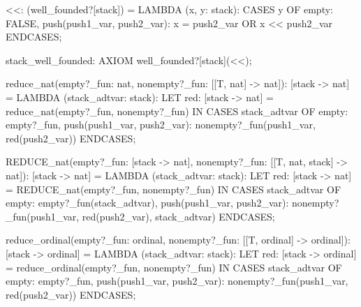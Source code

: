 
  <<:  (well_founded?[stack]) =
      LAMBDA (x, y: stack):
        CASES y
          OF empty: FALSE,
             push(push1_var, push2_var): x = push2_var OR x << push2_var
          ENDCASES;

  stack_well_founded: AXIOM well_founded?[stack](<<);

  reduce_nat(empty?_fun: nat, nonempty?_fun: [[T, nat] -> nat]):
  [stack -> nat] =
      LAMBDA (stack_adtvar: stack):
        LET red: [stack -> nat] = reduce_nat(empty?_fun, nonempty?_fun) IN
          CASES stack_adtvar
            OF empty: empty?_fun,
               push(push1_var, push2_var):
                 nonempty?_fun(push1_var, red(push2_var))
            ENDCASES;

  REDUCE_nat(empty?_fun: [stack -> nat],
             nonempty?_fun: [[T, nat, stack] -> nat]):
   [stack -> nat] =
      LAMBDA (stack_adtvar: stack):
        LET red: [stack -> nat] = REDUCE_nat(empty?_fun, nonempty?_fun) IN
          CASES stack_adtvar
            OF empty: empty?_fun(stack_adtvar),
               push(push1_var, push2_var):
                 nonempty?_fun(push1_var, red(push2_var), stack_adtvar)
            ENDCASES;

  reduce_ordinal(empty?_fun: ordinal,
                 nonempty?_fun: [[T, ordinal] -> ordinal]):
   [stack -> ordinal] =
      LAMBDA (stack_adtvar: stack):
        LET red: [stack -> ordinal] = reduce_ordinal(empty?_fun, nonempty?_fun)
          IN
          CASES stack_adtvar
            OF empty: empty?_fun,
               push(push1_var, push2_var):
                 nonempty?_fun(push1_var, red(push2_var))
            ENDCASES;
